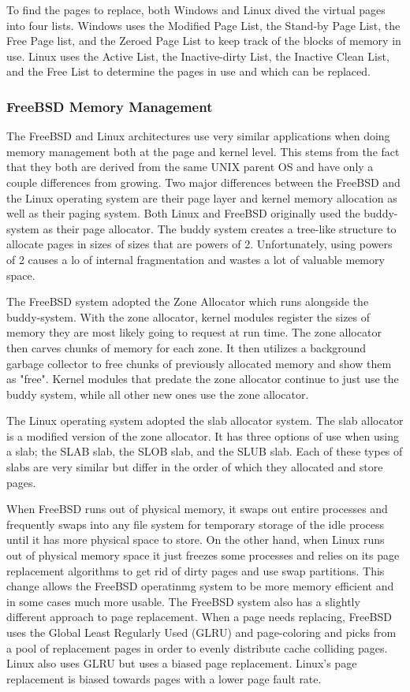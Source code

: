 \documentclass[draftclsnofoot, onecolumn, compsoc, 10pt]{IEEEtran}
\begin{document}
To find the pages to replace, both Windows and Linux dived the virtual pages into four lists. Windows uses the Modified Page List, the Stand-by Page List, the Free Page list, and the Zeroed Page List to keep track of the blocks of memory in use. Linux uses the Active List, the Inactive-dirty List, the Inactive Clean List, and the Free List to determine the pages in use and which can be replaced. 

\subsubsection{FreeBSD Memory Management}
The FreeBSD and Linux architectures use very similar applications when doing memory management both at the page and kernel level. This stems from the fact that they both are derived from the same UNIX parent OS and have only a couple differences from growing. Two major differences between the FreeBSD and the Linux operating system are their page layer and kernel memory allocation as well as their paging system. Both Linux and FreeBSD originally used the buddy-system as their page allocator\cite{dube_1998}. The buddy system creates a tree-like structure to allocate pages in sizes of sizes that are powers of 2. Unfortunately, using powers of 2 causes a lo of internal fragmentation and wastes a lot of valuable memory space.

The FreeBSD system adopted the Zone Allocator which runs alongside the buddy-system. With the zone allocator, kernel modules register the sizes of memory they are most likely going to request at run time. The zone allocator then carves chunks of memory for each zone. It then utilizes a background garbage collector to free chunks of previously allocated memory and show them as "free". Kernel modules that predate the zone allocator continue to just use the buddy system, while all other new ones use the zone allocator.\cite{dube_1998}

The Linux operating system adopted the slab allocator system. The slab allocator is a modified version of the zone allocator. It has three options of use when using a slab; the SLAB slab, the SLOB slab, and the SLUB slab. Each of these types of slabs are very similar but differ in the order of which they allocated and store pages. 

When FreeBSD runs out of physical memory, it swaps out entire processes and frequently swaps into any file system for temporary storage of the idle process until it has more physical space to store\cite{dube_1998}. On the other hand, when Linux runs out of physical memory space it just freezes some processes and relies on its page replacement algorithms to get rid of dirty pages and use swap partitions. This change allows the FreeBSD operatinmg system to be more memory efficient and in some cases much more usable. The FreeBSD system also has a slightly different approach to page replacement\cite{dube_1998}. When a page needs replacing, FreeBSD uses the Global Least Regularly Used (GLRU) and page-coloring and picks from a pool of replacement pages in order to evenly distribute cache colliding pages. Linux also uses GLRU but uses a biased page replacement. Linux's page replacement is biased towards pages with a lower page fault rate\cite{all_answers_ltd_2015}.
\end{document}
